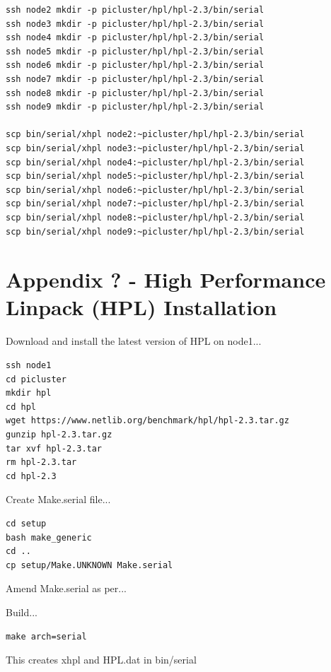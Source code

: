 \documentclass{article}
\begin{document}
\begin{lstlisting}[]
ssh node2 mkdir -p picluster/hpl/hpl-2.3/bin/serial
ssh node3 mkdir -p picluster/hpl/hpl-2.3/bin/serial
ssh node4 mkdir -p picluster/hpl/hpl-2.3/bin/serial
ssh node5 mkdir -p picluster/hpl/hpl-2.3/bin/serial
ssh node6 mkdir -p picluster/hpl/hpl-2.3/bin/serial
ssh node7 mkdir -p picluster/hpl/hpl-2.3/bin/serial
ssh node8 mkdir -p picluster/hpl/hpl-2.3/bin/serial
ssh node9 mkdir -p picluster/hpl/hpl-2.3/bin/serial

scp bin/serial/xhpl node2:~picluster/hpl/hpl-2.3/bin/serial
scp bin/serial/xhpl node3:~picluster/hpl/hpl-2.3/bin/serial
scp bin/serial/xhpl node4:~picluster/hpl/hpl-2.3/bin/serial
scp bin/serial/xhpl node5:~picluster/hpl/hpl-2.3/bin/serial
scp bin/serial/xhpl node6:~picluster/hpl/hpl-2.3/bin/serial
scp bin/serial/xhpl node7:~picluster/hpl/hpl-2.3/bin/serial
scp bin/serial/xhpl node8:~picluster/hpl/hpl-2.3/bin/serial
scp bin/serial/xhpl node9:~picluster/hpl/hpl-2.3/bin/serial
\end{lstlisting}



%
%
\clearpage\section*{Appendix ? - High Performance Linpack (HPL) Installation}

Download and install the latest version of HPL on node1...

\begin{lstlisting}[]
ssh node1
cd picluster
mkdir hpl
cd hpl
wget https://www.netlib.org/benchmark/hpl/hpl-2.3.tar.gz
gunzip hpl-2.3.tar.gz
tar xvf hpl-2.3.tar
rm hpl-2.3.tar
cd hpl-2.3
\end{lstlisting}

Create Make.serial file...

\begin{lstlisting}[]
cd setup
bash make_generic
cd ..
cp setup/Make.UNKNOWN Make.serial
\end{lstlisting}

Amend Make.serial as per...

Build...

\begin{lstlisting}[]
make arch=serial   
\end{lstlisting}

This creates xhpl and HPL.dat in bin/serial
\end{document}
